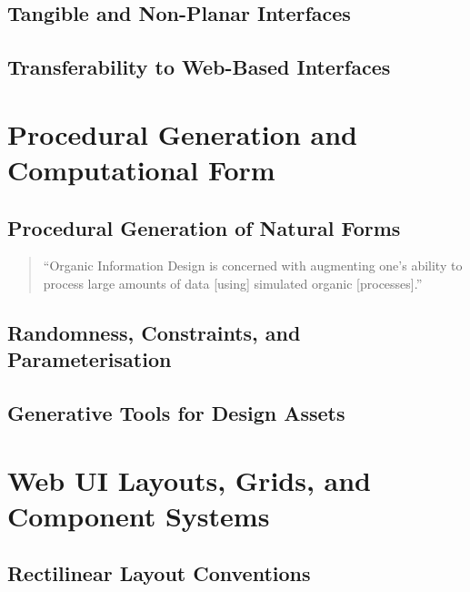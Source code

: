 \subsection{Tangible and Non-Planar Interfaces}

\subsection{Transferability to Web-Based Interfaces}

\section{Procedural Generation and Computational Form}
\subsection{Procedural Generation of Natural Forms}
\begin{quote}
``Organic Information Design is concerned with augmenting one's ability to process large amounts of data [using] simulated organic [processes].''
\end{quote}
\citep{fry_organic_1997}

\subsection{Randomness, Constraints, and Parameterisation}

\subsection{Generative Tools for Design Assets}

\section{Web UI Layouts, Grids, and Component Systems}
\subsection{Rectilinear Layout Conventions}

